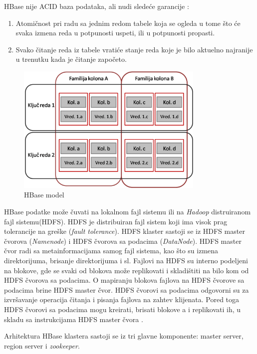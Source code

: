\documentclass[12pt,oneside]{memoir}
\begin{document}
HBase nije ACID baza podataka, ali nudi sledeće garancije \cite{hbaseACID}: 

\begin{enumerate}
\item[\textbullet] Atomičnost pri radu sa jednim redom tabele koja se ogleda u tome što će svaka izmena reda u potpunosti uspeti, ili u potpunosti propasti.
\item[\textbullet] Svako čitanje reda iz tabele vratiće stanje reda koje je bilo aktuelno najranije u trenutku kada je čitanje započeto. 
\end{enumerate}

\begin{figure}[!ht]
  \centering
  \includegraphics[width=0.8\textwidth]{colFamily.png}
  \caption{HBase model}
  \label{fig:grafikon}
\end{figure}

HBase podatke može čuvati na lokalnom fajl sistemu ili na \textit{Hadoop} distruiranom fajl sistemu(HDFS). HDFS je distribuiran fajl sistem koji ima visok prag tolerancije na greške (\textit{fault tolerance}). HDFS klaster sastoji se iz HDFS master čvorova (\textit{Namenode}) i HDFS čvorova sa podacima (\textit{DataNode}). HDFS master čvor radi sa metainformacijama samog fajl sistema, kao što su izmena direktorijuma, brisanje direktorijuma i sl. Fajlovi na HDFS su interno podeljeni na blokove, gde se svaki od blokova može replikovati i skladištiti na bilo kom od HDFS čvorova sa podacima. O mapiranju blokova fajlova na HDFS čvorove sa podacima brine HDFS master čvor. HDFS čvorovi sa podacima odgovorni su za izvršavanje operacija čitanja i pisanja fajlova na zahtev klijenata. Pored toga HDFS čvorovi sa podacima mogu kreirati, brisati blokove a i replikovati ih, u skladu sa instrukcijama HDFS master čvora \cite{hdfs}.

Arhitektura HBase klastera sastoji se iz tri glavne komponente: master server, region server i \textit{zookeeper}.
\end{document}
